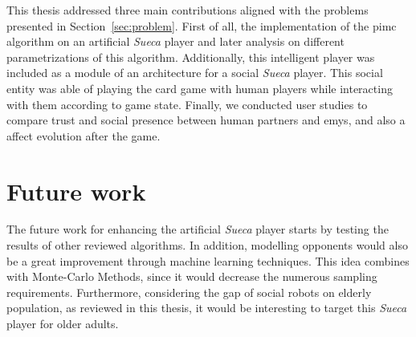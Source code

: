 \label{chapter:conclusion}

This thesis addressed three main contributions aligned with the problems presented in Section~\ref{sec:problem}.
First of all, the implementation of the \ac{pimc} algorithm on an artificial \emph{Sueca} player and later analysis on different parametrizations of this algorithm.
Additionally, this intelligent player was included as a module of an architecture for a social \emph{Sueca} player.
This social entity was able of playing the card game with human players while interacting with them according to game state.
Finally, we conducted user studies to compare trust and social presence between human partners and \ac{emys}, and also a affect evolution after the game.

\section{Future work}
The future work for enhancing the artificial \emph{Sueca} player starts by testing the results of other reviewed algorithms.
In addition, modelling opponents would also be a great improvement through machine learning techniques.
This idea combines with Monte-Carlo Methods, since it would decrease the numerous sampling requirements.
Furthermore, considering the gap of social robots on elderly population, as reviewed in this thesis, it would be interesting to target this \emph{Sueca} player for older adults.


\cleardoublepage